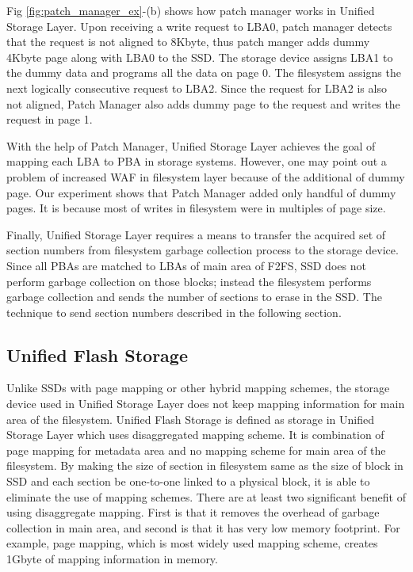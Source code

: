 \documentclass[letterpaper,twocolumn,10pt]{article}
\begin{document}
Fig \ref{fig:patch_manager_ex}-(b) shows how patch manager works in Unified Storage Layer. Upon receiving a write request to LBA0, patch manager detects that the request is not aligned to 8Kbyte, thus patch manger adds dummy 4Kbyte page along with LBA0 to the SSD. The storage device assigns LBA1 to the dummy data and programs all the data on page 0. The filesystem assigns the next logically consecutive request to LBA2. Since the request for LBA2 is also not aligned, Patch Manager also adds dummy page to the request and writes the request in page 1.

With the help of Patch Manager, Unified Storage Layer achieves the goal of mapping each LBA to PBA in storage systems. However, one may point out a problem of increased WAF in filesystem layer because of the additional of dummy page. Our experiment shows that Patch Manager added only handful of dummy pages. It is because most of writes in filesystem were in multiples of page size.

Finally, Unified Storage Layer requires a means to transfer the acquired set of section numbers from filesystem garbage collection process to the storage device. Since all PBAs are matched to LBAs of main area of F2FS, SSD does not perform garbage collection on those blocks; instead the filesystem performs garbage collection and sends the number of sections to erase in the SSD. The technique to send section numbers described in the following section.


\subsection{Unified Flash Storage}
\label{subsec:flash_storage}

Unlike SSDs with page mapping or other hybrid mapping schemes, the storage device used in Unified Storage Layer does not keep mapping information for main area of the filesystem. Unified Flash Storage is defined as storage in Unified Storage Layer which uses disaggregated mapping scheme. It is combination of page mapping for metadata area and no mapping scheme for main area of the filesystem. By making the size of section in filesystem same as the size of block in SSD and each section be one-to-one linked to a physical block, it is able to eliminate the use of mapping schemes. There are at least two significant benefit of using disaggregate mapping. First is that it removes the overhead of garbage collection in main area, and second is that it has very low memory footprint. For example, page mapping, which is most widely used mapping scheme, creates 1Gbyte of mapping information in memory.
\end{document}
